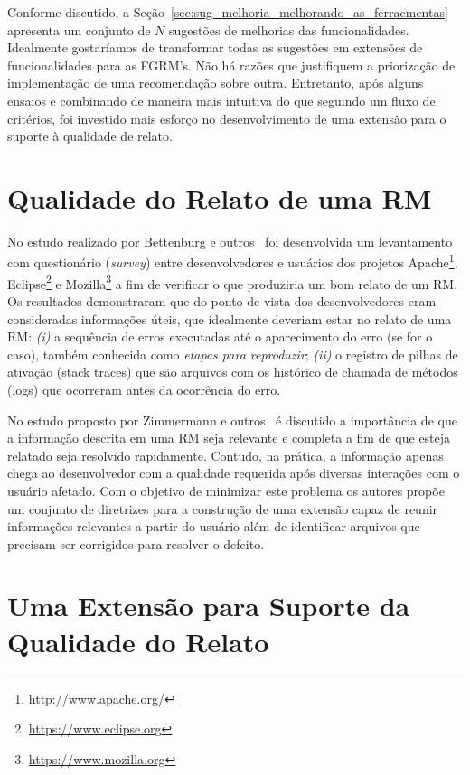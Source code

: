 Conforme discutido, a Seção~\ref{sec:sug_melhoria_melhorando_as_ferraementas}
apresenta um conjunto de $N$ sugestões de melhorias das funcionalidades.
Idealmente gostaríamos de transformar todas as sugestões em extensões de
funcionalidades para as FGRM's. Não há razões que justifiquem a priorização de
implementação de uma recomendação sobre outra. Entretanto, após alguns ensaios e
combinando de maneira mais intuitiva do que seguindo um fluxo de critérios,  foi
investido mais esforço no desenvolvimento de uma extensão para o suporte à
qualidade de relato.

\section{Qualidade do Relato de uma RM}
\label{sec:avaliando_a_qualidade_do_relato_de_uma_rm}

No estudo realizado por Bettenburg e outros~\cite{bettenburg2008makes} foi
desenvolvida um levantamento com questionário (\textit{survey}) entre
desenvolvedores e usuários dos projetos
Apache\footnote{\url{http://www.apache.org/}},
Eclipse\footnote{\url{https://www.eclipse.org}} e
Mozilla\footnote{\url{https://www.mozilla.org}} a fim de verificar o que
produziria um bom relato de um RM\@. Os resultados demonstraram que do ponto de
vista dos desenvolvedores eram consideradas informações úteis, que idealmente
deveriam estar no relato de uma RM\@: \textit{(i)} a sequência de erros
executadas até o aparecimento do erro (se for o caso), também conhecida como
\textit{etapas para reproduzir}; \textit{(ii)} o registro de pilhas de ativação
(stack traces) que são arquivos com os histórico de chamada de métodos (logs)
que ocorreram antes da ocorrência do erro.

No estudo proposto por Zimmermann e outros~\cite{5070993} é discutido a
importância de que a informação descrita em uma RM seja relevante e completa a
fim de que esteja relatado seja resolvido rapidamente. Contudo, na prática, a
informação apenas chega ao desenvolvedor com a qualidade requerida após diversas
interações com o usuário afetado. Com o objetivo de minimizar este problema os
autores propõe um conjunto de diretrizes para a construção de uma extensão capaz
de reunir informações relevantes a partir do usuário além de identificar
arquivos que precisam ser corrigidos para resolver o defeito.

\section{Uma Extensão para Suporte da Qualidade do Relato}
\label{sec:uma_extensao_suporte_qualidade_relato}

